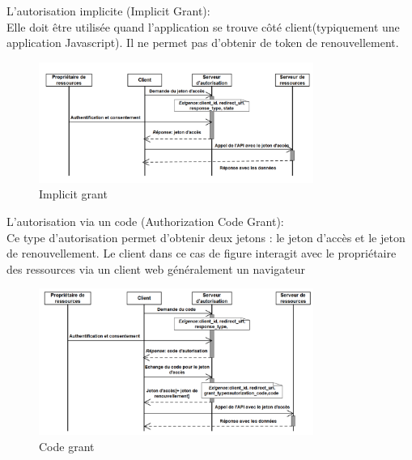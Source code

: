 \begin{list}{•}
	\item L’autorisation implicite (Implicit Grant): \\
	Elle doit être utilisée quand l’application se trouve côté
	client(typiquement une application Javascript). Il ne permet pas d’obtenir de token de renouvellement.
	
	\begin{figure}[!th]
            \centering
                \includegraphics[width=0.8\textwidth]{Figures/implicit_grant}
	       \decoRule
		\caption[Implicit grant]{Implicit grant}
	\label{fig:implicit}
	\end{figure}
	
	\item L’autorisation via un code (Authorization Code Grant): \\
	Ce type d’autorisation permet d’obtenir deux jetons : le jeton d’accès et le jeton de renouvellement. Le client dans ce cas de figure interagit
	avec le propriétaire des ressources via un client web généralement un navigateur
	\begin{figure}[!th]
            \centering
                \includegraphics[width=0.8\textwidth]{Figures/code_grant}
	       \decoRule
		\caption[Code grant]{Code grant}
	\label{fig:Code}
	\end{figure}
	

\end{list}
